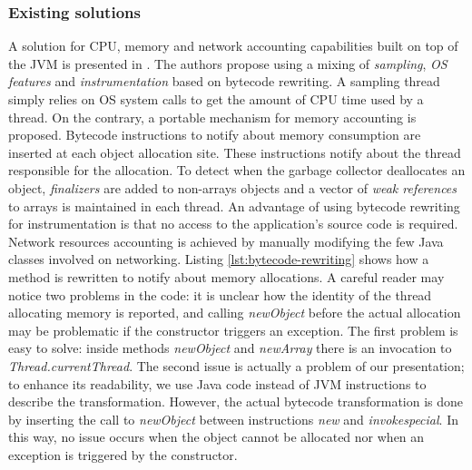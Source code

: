 \subsubsection*{Existing solutions}
A solution for CPU, memory and network accounting capabilities built on top of the JVM is presented in \cite{czajkowski_jres:_1998}.
The authors propose using a mixing of \textit{sampling}, \textit{OS features} and \textit{instrumentation} based on bytecode rewriting.
A sampling thread simply relies on OS system calls to get the amount of CPU time used by a thread.
On the contrary, a portable mechanism for memory accounting is proposed.
Bytecode instructions to notify about memory consumption are inserted at each object allocation site.
These instructions notify about the thread responsible for the allocation.
To detect when the garbage collector deallocates an object, \textit{finalizers} are added to non-arrays objects and a vector of \textit{weak references} to arrays is maintained in each thread.
An advantage of using bytecode rewriting for instrumentation is that no access to the application's source code is required.
Network resources accounting is achieved by manually modifying the few Java classes involved on networking.
Listing \ref{lst:bytecode-rewriting} shows how a method is rewritten to notify about memory allocations. 
A careful reader may notice two problems in the code: it is unclear how the identity of the thread allocating memory is reported, and calling \textit{newObject} before the actual allocation may be problematic if the constructor triggers an exception.
The first problem is easy to solve: inside methods \textit{newObject} and \textit{newArray} there is an invocation to \textit{Thread.currentThread}.
The second issue is actually a problem of our presentation; to enhance its readability, we use Java code instead of JVM instructions to describe the transformation.
However, the actual bytecode transformation is done by inserting the call to \textit{newObject} between instructions \textit{new} and \textit{invokespecial}.
In this way, no issue occurs when the object cannot be allocated nor when an exception is triggered by the constructor.

\begin{lstlisting}
\end{lstlisting}


